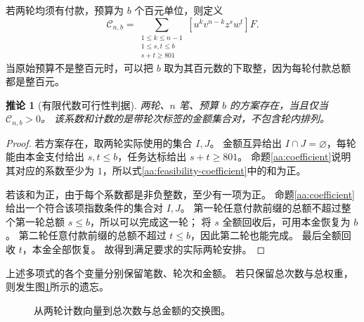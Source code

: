 \documentclass[UTF8,a4paper]{ctexbook}
\newtheorem{corollary}[theorem]{推论}
\theoremstyle{definition}
\numberwithin{equation}{chapter}
\newcommand{\1}{\mathbf{1}}
\begin{document}
若两轮均须有付款，预算为 \(b\) 个百元单位，则定义
\begin{equation}\label{aa:feasibility-coefficient}
\mathcal C_{n,b}
=
\sum_{\substack{1\le k\le n-1\\
                1\le s,t\le b\\
                s+t\ge801}}
[u^k v^{n-k}z^s w^t]F.
\end{equation}
当原始预算不是整百元时，可以把 \(b\) 取为其百元数的下取整，因为每轮付款总额都是整百元。

\begin{corollary}[有限代数可行性判据]\label{aa:feasibility}
两轮、\(n\) 笔、预算 \(b\) 的方案存在，当且仅当
\(\mathcal C_{n,b}>0\)。
该系数和计数的是带轮次标签的金额集合对，不包含轮内排列。
\end{corollary}

\begin{proof}
若方案存在，取两轮实际使用的集合 \(I,J\)。
金额互异给出 \(I\cap J=\varnothing\)，每轮能由本金支付给出 \(s,t\le b\)，任务达标给出 \(s+t\ge801\)。
命题\ref{aa:coefficient}说明其对应的系数至少为 \(1\)，所以式\eqref{aa:feasibility-coefficient}中的和为正。

若该和为正，由于每个系数都是非负整数，至少有一项为正。
命题\ref{aa:coefficient}给出一个符合该项指数条件的集合对 \(I,J\)。
第一轮任意付款前缀的总额不超过整个第一轮总额 \(s\le b\)，所以可以完成这一轮；
将 \(s\) 全额回收后，可用本金恢复为 \(b\)。
第二轮任意付款前缀的总额不超过 \(t\le b\)，因此第二轮也能完成。
最后全额回收 \(t\)，本金全部恢复。
故得到满足要求的实际两轮安排。
\end{proof}

上述多项式的各个变量分别保留笔数、轮次和金额。
若只保留总次数与总权重，则发生图\ref{aa:forgetful-square}所示的遗忘。

\begin{figure}[htbp]
\centering
{}
\caption{从两轮计数向量到总次数与总金额的交换图。}
\label{aa:forgetful-square}
\end{figure}
\end{document}
